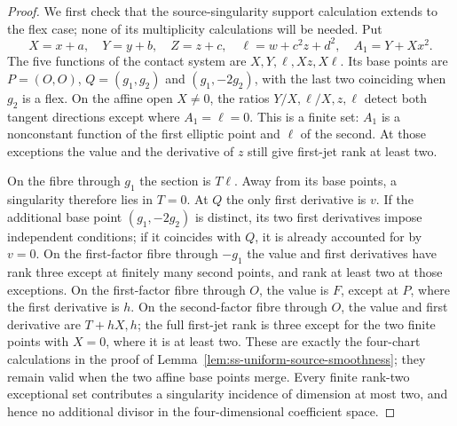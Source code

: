 \begin{proof}
We first check that the source-singularity support calculation
extends to the flex case; none of its multiplicity calculations
will be needed.  Put
\[
 X=x+a,\quad Y=y+b,\quad Z=z+c,\quad
 \ell=w+c^2z+d^2,\quad A_1=Y+Xx^2.
\]
The five functions of the contact system are
$X,Y,\ell,Xz,X\ell$.  Its base points are
$P=(O,O)$, $Q=(g_1,g_2)$ and $(g_1,-2g_2)$, with the last two
coinciding when $g_2$ is a flex.
On the affine open $X\ne0$, the ratios
$Y/X,\ell/X,z,\ell$ detect both tangent directions except where
$A_1=\ell=0$.  This is a finite set: $A_1$ is a nonconstant
function of the first elliptic point and $\ell$ of the second.
At those exceptions the value and the derivative of $z$ still
give first-jet rank at least two.

On the fibre through $g_1$ the section is $T\ell$.
Away from its base points, a singularity therefore lies in $T=0$.
At $Q$ the only first derivative is $v$.  If the additional base
point $(g_1,-2g_2)$ is distinct, its two first derivatives impose
independent conditions; if it coincides with $Q$, it is already
accounted for by $v=0$.  On the first-factor fibre through $-g_1$
the value and first derivatives have rank three except at finitely
many second points, and rank at least two at those exceptions.
On the first-factor fibre through $O$, the value is $F$, except
at $P$, where the first derivative is $h$.  On the second-factor
fibre through $O$, the value and first derivative are $T+hX,h$;
the full first-jet rank is three except for the two finite points
with $X=0$, where it is at least two.
These are exactly the four-chart calculations in the proof of
Lemma~\ref{lem:ss-uniform-source-smoothness}; they remain valid
when the two affine base points merge.
Every finite rank-two exceptional set contributes a singularity
incidence of dimension at most two, and hence no additional divisor
in the four-dimensional coefficient space.


\end{proof}
